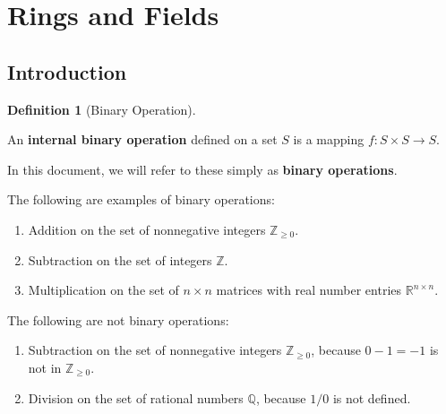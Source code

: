 \documentclass{scrartcl}
\theoremstyle{definition}
\newtheorem{definition}{Definition}[section]
\theoremstyle{plain}
\begin{document}
\section{Rings and Fields}

\subsection{Introduction}

\begin{definition}[Binary Operation]
    \label{def:binary operation}

    \newcommand{\Q}{\mathbb{Q}}
    \newcommand{\R}{\mathbb{R}}
    \newcommand{\Z}{\mathbb{Z}}

    An \textbf{internal binary operation} defined on a set $S$ is a mapping $f:S\times S\to S$.

    In this document, we will refer to these simply as \textbf{binary operations}.

    The following are examples of binary operations:
    \begin{enumerate}
        \item Addition on the set of nonnegative integers $\Z_{\geq 0}$.
        \item Subtraction on the set of integers $\Z$.
        \item Multiplication on the set of $n\times n$ matrices with real number entries $\R^{n\times n}$.
    \end{enumerate}

    The following are not binary operations:
    \begin{enumerate}
        \item Subtraction on the set of nonnegative integers $\Z_{\geq 0}$, because $0-1=-1$ is not in $\Z_{\geq 0}$.
        \item Division on the set of rational numbers $\Q$, because $1/0$ is not defined.
    \end{enumerate}
\end{definition}
\end{document}
